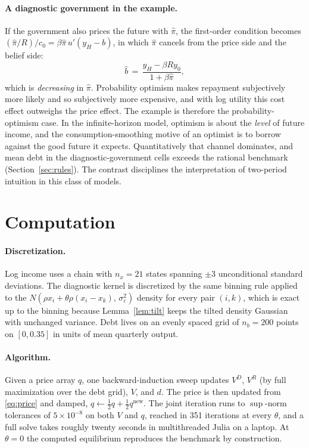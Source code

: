 \documentclass[11pt]{article}
\theoremstyle{definition}
\begin{document}
\paragraph{A diagnostic government in the example.} If the government also prices the future with $\hat\pi$, the first-order condition becomes $(\hat\pi/R)/c_0 = \beta \hat\pi\, u'(y_H - b)$, in which $\hat\pi$ cancels from the price side and the belief side:
\[
\hat b \,=\, \frac{y_H - \beta R y_0}{1 + \beta \hat\pi},
\]
which is \emph{decreasing} in $\hat\pi$. Probability optimism makes repayment subjectively more likely and so subjectively more expensive, and with log utility this cost effect outweighs the price effect. The example is therefore the probability-optimism case. In the infinite-horizon model, optimism is about the \emph{level} of future income, and the consumption-smoothing motive of an optimist is to borrow against the good future it expects. Quantitatively that channel dominates, and mean debt in the diagnostic-government cells exceeds the rational benchmark (Section~\ref{sec:rules}). The contrast disciplines the interpretation of two-period intuition in this class of models.

\section{Computation}\label{app:computation}

\paragraph{Discretization.} Log income uses a \citet{Tauchen1986} chain with $n_x = 21$ states spanning $\pm 3$ unconditional standard deviations. The diagnostic kernel is discretized by the same binning rule applied to the $N(\rho x_i + \theta\rho(x_i - x_k),\, \sigma_\varepsilon^2)$ density for every pair $(i, k)$, which is exact up to the binning because Lemma~\ref{lem:tilt} keeps the tilted density Gaussian with unchanged variance. Debt lives on an evenly spaced grid of $n_b = 200$ points on $[0, 0.35]$ in units of mean quarterly output.

\paragraph{Algorithm.} Given a price array $q$, one backward-induction sweep updates $V^D$, $V^R$ (by full maximization over the debt grid), $V$, and $d$. The price is then updated from \eqref{eq:price} and damped, $q \leftarrow \tfrac12 q + \tfrac12 q^{\text{new}}$. The joint iteration runs to $\sup$-norm tolerances of $5 \times 10^{-8}$ on both $V$ and $q$, reached in 351 iterations at every $\theta$, and a full solve takes roughly twenty seconds in multithreaded Julia on a laptop. At $\theta = 0$ the computed equilibrium reproduces the \citet{Arellano2008} benchmark by construction.
\end{document}
